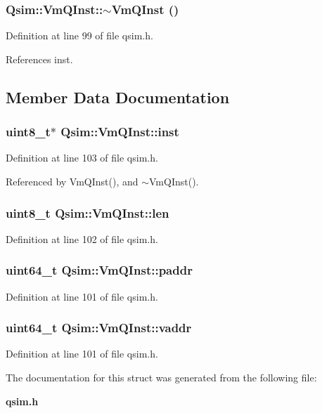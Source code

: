 \subsubsection[{$\sim$VmQInst}]{\setlength{\rightskip}{0pt plus 5cm}Qsim::VmQInst::$\sim$VmQInst ()\hspace{0.3cm}{\tt  [inline]}}\label{structQsim_1_1VmQInst_4e681e9d722fde229a5d604df7d8a8f0}




Definition at line 99 of file qsim.h.

References inst.

\subsection{Member Data Documentation}
\subsubsection[{inst}]{\setlength{\rightskip}{0pt plus 5cm}uint8\_\-t$\ast$ {\bf Qsim::VmQInst::inst}}\label{structQsim_1_1VmQInst_e184916566a7a97022e53176bd4e55bd}




Definition at line 103 of file qsim.h.

Referenced by VmQInst(), and $\sim$VmQInst().
\subsubsection[{len}]{\setlength{\rightskip}{0pt plus 5cm}uint8\_\-t {\bf Qsim::VmQInst::len}}\label{structQsim_1_1VmQInst_7b14b6c249d425da92725a8f850d6c92}




Definition at line 102 of file qsim.h.
\subsubsection[{paddr}]{\setlength{\rightskip}{0pt plus 5cm}uint64\_\-t {\bf Qsim::VmQInst::paddr}}\label{structQsim_1_1VmQInst_f5c063db3a58690ef5d54166a4c6468f}




Definition at line 101 of file qsim.h.
\subsubsection[{vaddr}]{\setlength{\rightskip}{0pt plus 5cm}uint64\_\-t {\bf Qsim::VmQInst::vaddr}}\label{structQsim_1_1VmQInst_24a12a997bab135c7265e5356f3c6f48}




Definition at line 101 of file qsim.h.

The documentation for this struct was generated from the following file:\begin{CompactItemize}
\item 
{\bf qsim.h}\end{CompactItemize}
